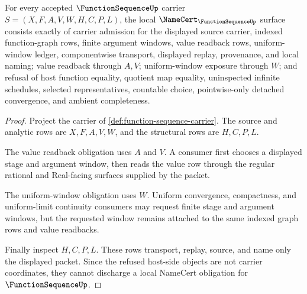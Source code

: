 \begin{theorem}
\label{thm:function-sequence-namecert-obligations}
For every accepted $\FunctionSequenceUp$ carrier $S=(X,F,A,V,W,H,C,P,L)$, the local $\NameCert_{\FunctionSequenceUp}$ surface consists exactly of carrier admission for the displayed source carrier, indexed function-graph rows, finite argument windows, value readback rows, uniform-window ledger, componentwise transport, displayed replay, provenance, and local naming; value readback through $A,V$; uniform-window exposure through $W$; and refusal of host function equality, quotient map equality, uninspected infinite schedules, selected representatives, countable choice, pointwise-only detached convergence, and ambient completeness.
\end{theorem}
\begin{proof}
Project the carrier of \autoref{def:function-sequence-carrier}. The source and analytic rows are $X,F,A,V,W$, and the structural rows are $H,C,P,L$.

The value readback obligation uses $A$ and $V$. A consumer first chooses a displayed stage and argument window, then reads the value row through the regular rational and Real-facing surfaces supplied by the packet.

The uniform-window obligation uses $W$. Uniform convergence, compactness, and uniform-limit continuity consumers may request finite stage and argument windows, but the requested window remains attached to the same indexed graph rows and value readbacks.

Finally inspect $H,C,P,L$. These rows transport, replay, source, and name only the displayed packet. Since the refused host-side objects are not carrier coordinates, they cannot discharge a local NameCert obligation for $\FunctionSequenceUp$.
\end{proof}

